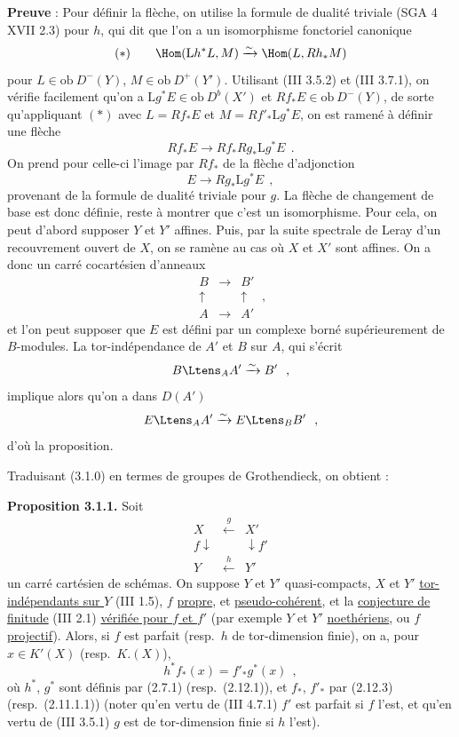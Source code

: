 \medskip

\noindent\textbf{Preuve} : Pour d\'{e}finir la fl\`{e}che, on utilise la formule de dualit\'{e} triviale (SGA 4 XVII 2.3) pour $h$, qui dit que l'on a un isomorphisme fonctoriel canonique
\[
(*) \qquad \Hom(\mathrm{L}h^* L, M) \xrightarrow{\sim} \Hom(L, Rh_* M)
\]
pour $L \in \mathrm{ob}\ D^-(Y)$, $M \in \mathrm{ob}\ D^+(Y')$. Utilisant (III 3.5.2) et (III 3.7.1), on v\'{e}rifie facilement qu'on a $\mathrm{L}g^* E \in \mathrm{ob}\ D^b(X')$ et $Rf_* E \in \mathrm{ob}\ D^-(Y)$, de sorte qu'appliquant $(*)$ avec $L = Rf_* E$ et $M = Rf'_* \mathrm{L}g^* E$, on est ramen\'{e} \`{a} d\'{e}finir une fl\`{e}che
\[
Rf_* E \longrightarrow Rf_* Rg_* \mathrm{L}g^* E\ \ .
\]
On prend pour celle-ci l'image par $Rf_*$ de la fl\`{e}che d'adjonction
\[
E \longrightarrow Rg_* \mathrm{L}g^* E\ \ ,
\]
provenant de la formule de dualit\'{e} triviale pour $g$. La fl\`{e}che de changement de base est donc d\'{e}finie, reste \`{a} montrer que c'est un isomorphisme. Pour cela, on peut d'abord supposer $Y$ et $Y'$ affines. Puis, par la suite spectrale de Leray d'un recouvrement ouvert de $X$, on se ram\`{e}ne au cas o\`{u} $X$ et $X'$ sont affines. On a donc un carr\'{e} cocart\'{e}sien d'anneaux
\[
\begin{array}{ccc}
B & \longrightarrow & B' \\
\uparrow & & \uparrow \\
A & \longrightarrow & A'
\end{array}
\ ,
\]
et l'on peut supposer que $E$ est d\'{e}fini par un complexe born\'{e} sup\'{e}rieurement de $B$-modules. La tor-ind\'{e}pendance de $A'$ et $B$ sur $A$, qui s'\'{e}crit
\[
B \Ltens_A A' \xrightarrow{\sim} B'\ \ ,
\]
implique alors qu'on a dans $D(A')$
\[
E \Ltens_A A' \xrightarrow{\sim} E \Ltens_B B'\ \ ,
\]
d'o\`{u} la proposition.

Traduisant (3.1.0) en termes de groupes de Grothendieck, on obtient :

\medskip

\noindent\textbf{Proposition 3.1.1.} Soit
\[
\begin{array}{ccc}
X & \xleftarrow{\ g\ } & X' \\
f \downarrow & & \downarrow f' \\
Y & \xleftarrow{\ h\ } & Y'
\end{array}
\]
un carr\'{e} cart\'{e}sien de sch\'{e}mas. On suppose $Y$ et $Y'$ quasi-compacts, $X$ et $Y'$ \underline{tor-ind\'{e}pendants sur $Y$} (III 1.5), $f$ \underline{propre}, et \underline{pseudo-coh\'{e}rent}, et la \underline{conjecture de finitude} (III 2.1) \underline{v\'{e}rifi\'{e}e pour $f$ et $f'$} (par exemple $Y$ et $Y'$ \underline{noeth\'{e}riens}, ou $f$ \underline{projectif}). Alors, si $f$ est parfait (resp.\ $h$ de tor-dimension finie), on a, pour $x \in K'(X)$ (resp.\ $K.(X)$),
\[
h^* f_*(x) = f'_* g^*(x)\ \ ,
\]
o\`{u} $h^*$, $g^*$ sont d\'{e}finis par (2.7.1) (resp.\ (2.12.1)), et $f_*$, $f'_*$ par (2.12.3) (resp.\ (2.11.1.1)) (noter qu'en vertu de (III 4.7.1) $f'$ est parfait si $f$ l'est, et qu'en vertu de (III 3.5.1) $g$ est de tor-dimension finie si $h$ l'est).


